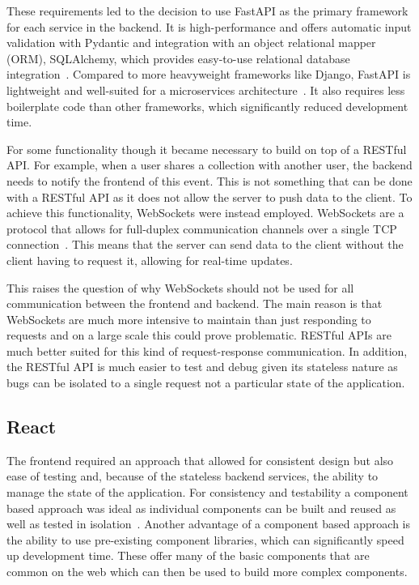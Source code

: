 These requirements led to the decision to use FastAPI as the primary framework for each service in the backend. It is high-performance and offers automatic input validation with Pydantic and integration with an object relational mapper (ORM), SQLAlchemy, which provides easy-to-use relational database integration~\cite{FastAPI}. Compared to more heavyweight frameworks like Django, FastAPI is lightweight and well-suited for a microservices architecture~\cite{9717259}. It also requires less boilerplate code than other frameworks, which significantly reduced development time.

For some functionality though it became necessary to build on top of a RESTful API. For example, when a user shares a collection with another user, the backend needs to notify the frontend of this event. This is not something that can be done with a RESTful API as it does not allow the server to push data to the client. To achieve this functionality, WebSockets were instead employed. WebSockets are a protocol that allows for full-duplex communication channels over a single TCP connection~\cite{WebSocket}. This means that the server can send data to the client without the client having to request it, allowing for real-time updates.

This raises the question of why WebSockets should not be used for all communication between the frontend and backend. The main reason is that WebSockets are much more intensive to maintain than just responding to requests and on a large scale this could prove problematic. RESTful APIs are much better suited for this kind of request-response communication. In addition, the RESTful API is much easier to test and debug given its stateless nature as bugs can be isolated to a single request not a particular state of the application.

\subsection{React}
The frontend required an approach that allowed for consistent design but also ease of testing and, because of the stateless backend services, the ability to manage the state of the application. For consistency and testability a component based approach was ideal as individual components can be built and reused as well as tested in isolation~\cite{10638895}. Another advantage of a component based approach is the ability to use pre-existing component libraries, which can significantly speed up development time. These offer many of the basic components that are common on the web which can then be used to build more complex components.

